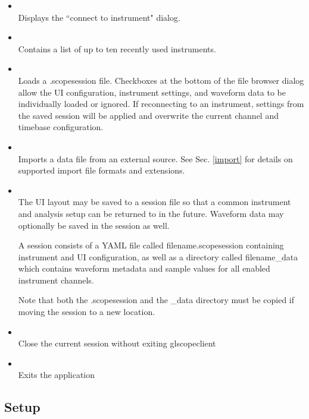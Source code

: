 \begin{itemize}
\item {}\\
Displays the ``connect to instrument" dialog.

\item {}\\
Contains a list of up to ten recently used instruments.

\item {}\\
Loads a .scopesession file. Checkboxes at the bottom of the file browser dialog allow the UI configuration, instrument
settings, and waveform data to be individually loaded or ignored. If reconnecting to an instrument, settings from the
saved session will be applied and overwrite the current channel and timebase configuration.

\item {}\\
Imports a data file from an external source. See Sec. \ref{import} for details on supported import file formats and
extensions.

\item {}\\
The UI layout may be saved to a session file so that a common instrument and analysis setup can be returned to in the
future. Waveform data may optionally be saved in the session as well.

A session consists of a YAML file called filename.scopesession containing instrument and UI configuration, as well
as a directory called filename\_data which contains waveform metadata and sample values for all enabled instrument
channels.

Note that both the .scopesession and the \_data directory must be copied if moving the session to a new location.

\item {}\\
Close the current session without exiting glscopeclient

\item {}\\
Exits the application

\end{itemize}


\subsection{Setup}

